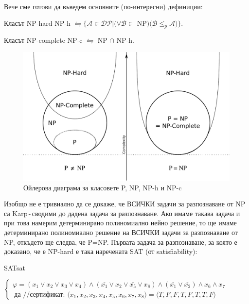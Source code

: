 \noindent
Вече сме готови да въведем основните (по-интересни) дефиниции:
\begin{boxdefinition}{Класът NP-hard}{}
	NP-h $\leftrightharpoons\{\mathcal{A}\in\mathcal{DP}|\big(\forall\mathcal{B}\in$ NP$\big)\big(\mathcal{B}\le_p\mathcal{A}\big)\}$.
\end{boxdefinition}
\begin{boxdefinition}{Класът NP-complete}{}
	NP-c $\leftrightharpoons$ NP $\cap$ NP-h.
\end{boxdefinition}
\begin{figure}[H]
	\centering
	\includegraphics[scale=.4]{images/Euler-Diagram-P-NP-NPh-NPc.pdf}
	\caption{Ойлерова диаграма за класовете P, NP, NP-h и NP-c}
\end{figure}
\noindent
Изобщо не е тривиално да се докаже, че ВСИЧКИ задачи за разпознаване от NP са Karp\,-\,сводими до дадена задача за разпознаване. Ако имаме такава задача и при това намерим детерминирано полиномиално нейно решение, то ще имаме детерминирано полиномиално решение на ВСИЧКИ задачи за разпознаване от NP, откъдето ще следва, че P=NP. Първата задача за разпознаване, за която е доказано, че е NP-hard е така наречената SAT (от satisfiability):
\begin{boxzzr}{SAT}{sat}
\end{boxzzr}
\begin{examplecp}
	$\begin{cases}
		\varphi=(x_1\lor x_2\lor x_3\lor x_4)\land(\overline{x_1}\lor x_2\lor\overline{x_5}\lor x_8)\land(\overline{x_1}\lor\overline{x_2})\land x_6\land x_7\\\
		\!\!\text{да //сертификат: }\langle x_1,x_2,x_3,x_4,x_5,x_6,x_7,x_8\rangle=\langle T,F,F,T,F,T,T,F\rangle
	\end{cases}$
\end{examplecp}\leavevmode\newline

